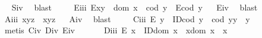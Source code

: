 \begin{isabellebody}
\isadelimproof
\ %
\endisadelimproof
%
\isatagproof
{}\isamarkupfalse%
\ S\isactrlsub i\isactrlsub v\ \isamarkupfalse%
\ blast%
\endisatagproof
{\isafoldproof}%
%
\isadelimproof
%
\endisadelimproof
\isanewline
\ \ \ \isamarkupfalse%
\ E\isactrlsub i\isactrlsub i\isactrlsub i{\isacharcolon}\ {\isachardoublequoteopen}E{\isacharparenleft}x{\isasymcdot}y{\isacharparenright}\ \isactrlbold {\isasymleftarrow}\ {\isacharparenleft}dom\ x\ {\isasymcong}\ cod\ y\ \isactrlbold {\isasymand}\ {\isacharparenleft}E{\isacharparenleft}cod\ y{\isacharparenright}{\isacharparenright}{\isacharparenright}{\isachardoublequoteclose}%
\isadelimproof
\ %
\endisadelimproof
%
\isatagproof
{}\isamarkupfalse%
\ E\isactrlsub i\isactrlsub v\ \isamarkupfalse%
\ blast%
\endisatagproof
{\isafoldproof}%
%
\isadelimproof
%
\endisadelimproof
\isanewline
\ \ \ \isamarkupfalse%
\ A\isactrlsub i\isactrlsub i\isactrlsub i{\isacharcolon}\ {\isachardoublequoteopen}x{\isasymcdot}{\isacharparenleft}y{\isasymcdot}z{\isacharparenright}\ {\isasymcong}\ {\isacharparenleft}x{\isasymcdot}y{\isacharparenright}{\isasymcdot}z{\isachardoublequoteclose}%
\isadelimproof
\ %
\endisadelimproof
%
\isatagproof
{}\isamarkupfalse%
\ A\isactrlsub i\isactrlsub v\ \isamarkupfalse%
\ blast%
\endisatagproof
{\isafoldproof}%
%
\isadelimproof
%
\endisadelimproof
\isanewline
\ \ \ \isamarkupfalse%
\ C\isactrlsub i\isactrlsub i\isactrlsub i{\isacharcolon}\ {\isachardoublequoteopen}E\ y\ \isactrlbold {\isasymrightarrow}\ {\isacharparenleft}ID{\isacharparenleft}cod\ y{\isacharparenright}\ \isactrlbold {\isasymand}\ {\isacharparenleft}cod\ y{\isacharparenright}{\isasymcdot}y\ {\isasymcong}\ y{\isacharparenright}{\isachardoublequoteclose}%
\isadelimproof
\ %
\endisadelimproof
%
\isatagproof
{}\isamarkupfalse%
\ {\isacharparenleft}metis\ C\isactrlsub i\isactrlsub v\ D\isactrlsub i\isactrlsub v\ E\isactrlsub i\isactrlsub v{\isacharparenright}%
\endisatagproof
{\isafoldproof}%
%
\isadelimproof
%
\endisadelimproof
\ \isanewline
\ \ \ \isamarkupfalse%
\ D\isactrlsub i\isactrlsub i\isactrlsub i{\isacharcolon}\ {\isachardoublequoteopen}E\ x\ \isactrlbold {\isasymrightarrow}\ {\isacharparenleft}ID{\isacharparenleft}dom\ x{\isacharparenright}\ \isactrlbold {\isasymand}\ x{\isasymcdot}{\isacharparenleft}dom\ x{\isacharparenright}\ {\isasymcong}\ x{\isacharparenright}{\isachardoublequoteclose}%
\isadelimproof
\ %
\endisadelimproof
%
\isatagproof
{}\isamarkupfalse%

\end{isabellebody}
